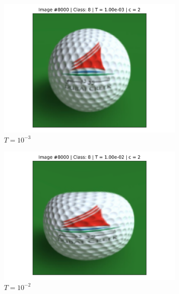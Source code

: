 \begin{figure}[!h]
\begin{subfigure}{0.18\textwidth}
    \includegraphics[width=\textwidth]{ch1-diffy/figures/warping_examples/8000_3_2.png}
    \caption{$T=10^{-3}$}
    \end{subfigure}
    \begin{subfigure}{0.18\textwidth}
    \includegraphics[width=\textwidth]{ch1-diffy/figures/warping_examples/8000_2_2.png}
    \caption{$T=10^{-2}$}
    \end{subfigure}
    \begin{subfigure}{0.18\textwidth}

\end{subfigure}
\end{figure}
